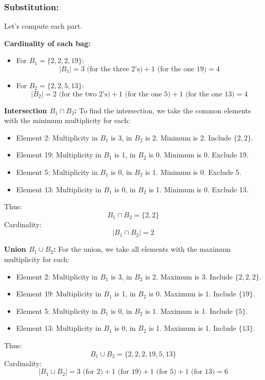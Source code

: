 \documentclass[12pt, a4paper, twoside]{report} %
\begin{document}
\subsubsection*{Substitution:}
Let’s compute each part.

\textbf{Cardinality of each bag:}
\begin{itemize}
  \item For \( B_1 = \{2, 2, 2, 19\} \):
    \[
    |B_1| = 3 \text{ (for the three 2’s)} + 1 \text{ (for the one 19)} = 4
    \]
  \item For \( B_2 = \{2, 2, 5, 13\} \):
    \[
    |B_2| = 2 \text{ (for the two 2’s)} + 1 \text{ (for the one 5)} + 1 \text{ (for the one 13)} = 4
    \]
\end{itemize}

\textbf{Intersection \( B_1 \cap B_2 \):}
To find the intersection, we take the common elements with the minimum multiplicity for each:
\begin{itemize}
  \item Element 2: Multiplicity in \( B_1 \) is 3, in \( B_2 \) is 2. Minimum is 2. Include \( \{2, 2\} \).
  \item Element 19: Multiplicity in \( B_1 \) is 1, in \( B_2 \) is 0. Minimum is 0. Exclude 19.
  \item Element 5: Multiplicity in \( B_1 \) is 0, in \( B_2 \) is 1. Minimum is 0. Exclude 5.
  \item Element 13: Multiplicity in \( B_1 \) is 0, in \( B_2 \) is 1. Minimum is 0. Exclude 13.
\end{itemize}
Thus:
\[
B_1 \cap B_2 = \{2, 2\}
\]
Cardinality:
\[
|B_1 \cap B_2| = 2
\]

\textbf{Union \( B_1 \cup B_2 \):}
For the union, we take all elements with the maximum multiplicity for each:
\begin{itemize}
  \item Element 2: Multiplicity in \( B_1 \) is 3, in \( B_2 \) is 2. Maximum is 3. Include \( \{2, 2, 2\} \).
  \item Element 19: Multiplicity in \( B_1 \) is 1, in \( B_2 \) is 0. Maximum is 1. Include \( \{19\} \).
  \item Element 5: Multiplicity in \( B_1 \) is 0, in \( B_2 \) is 1. Maximum is 1. Include \( \{5\} \).
  \item Element 13: Multiplicity in \( B_1 \) is 0, in \( B_2 \) is 1. Maximum is 1. Include \( \{13\} \).
\end{itemize}
Thus:
\[
B_1 \cup B_2 = \{2, 2, 2, 19, 5, 13\}
\]
Cardinality:
\[
|B_1 \cup B_2| = 3 \text{ (for 2)} + 1 \text{ (for 19)} + 1 \text{ (for 5)} + 1 \text{ (for 13)} = 6
\]
\end{document}
